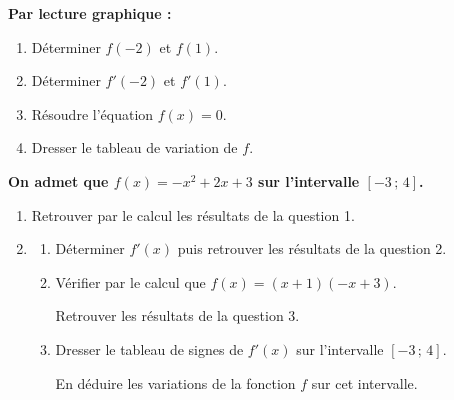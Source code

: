 \textbf{Par lecture graphique :}
\begin{enumerate}
\item Déterminer $f(-2)$ et $f(1)$.
\item Déterminer $f'(-2)$ et $f'(1)$.
\item Résoudre l'équation $f(x)=0$.
\item Dresser le tableau de variation de $f$.
\end{enumerate}

\textbf{On admet que $f(x)=-x^2+2x+3$ sur l'intervalle $[-3\,;\,4]$.}
\begin{enumerate}[resume]
\item Retrouver par le calcul les résultats de la question 1.
\item
\begin{enumerate}[label=\alph*)]
\item Déterminer $f'(x)$ puis retrouver les résultats de la question 2.
\item Vérifier par le calcul que $f(x)=(x+1)(-x+3)$.\par Retrouver les résultats de la question 3.
\item Dresser le tableau de signes de $f'(x)$ sur l'intervalle $[-3\,;\,4]$.\par En déduire les variations de la fonction $f$ sur cet intervalle.
\end{enumerate}
\end{enumerate}

\bigskip
